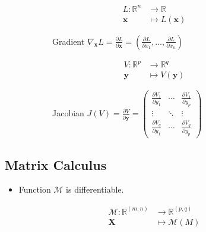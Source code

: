 \documentclass{book}
\newcommand{\x}{\mathbf{x}}
\newcommand{\y}{\mathbf{y}}
\newcommand{\X}{\mathbf{X}}
\newcommand{\R}{\mathbb{R}}
\begin{document}
\begin{figure}[h]
    \centering
    \begin{subfigure}{.5\textwidth}
        \begin{equation*}
        \begin{split}
        L: \R^n & \longrightarrow \R\\
        \x & \longmapsto L(\x)
        \end{split}
        \end{equation*}
        \begin{block}{Gradient}
        \centering
        $\nabla_\x L = \frac{\partial L}{\partial \x} = (\frac{\partial L}{\partial x_1}, \ldots, \frac{\partial L}{\partial x_n}) $
        \end{block}
    \end{subfigure}
    \begin{subfigure}{.5\textwidth}
        \begin{equation*}
        \begin{split}
        V: \R^p & \longrightarrow \R^q\\
        \y & \longmapsto V(\y)
        \end{split}
        \end{equation*}
        \begin{block}{Jacobian}
        \centering
        $J(V) = \frac{\partial V}{\partial \y} =
        \begin{pmatrix}
        \frac{\partial V_1}{\partial y_1} & \cdots & \frac{\partial V_1}{\partial y_p} \\
        \vdots & \ddots & \vdots \\
        \frac{\partial V_q}{\partial y_1} & \cdots & \frac{\partial V_q}{\partial y_p}
        \end{pmatrix}
        $
        \end{block}
    \end{subfigure}
\end{figure}

\subsection{Matrix Calculus}

\begin{itemize}
\item Function $\mathcal{M}$ is differentiable.
\end{itemize}

\begin{equation*}
\begin{split}
\mathcal{M}: \R^{(m,n)} & \longrightarrow \R^{(p,q)}\\
\X & \longmapsto \mathcal{M}(M)
\end{split}
\end{equation*}
\end{document}
